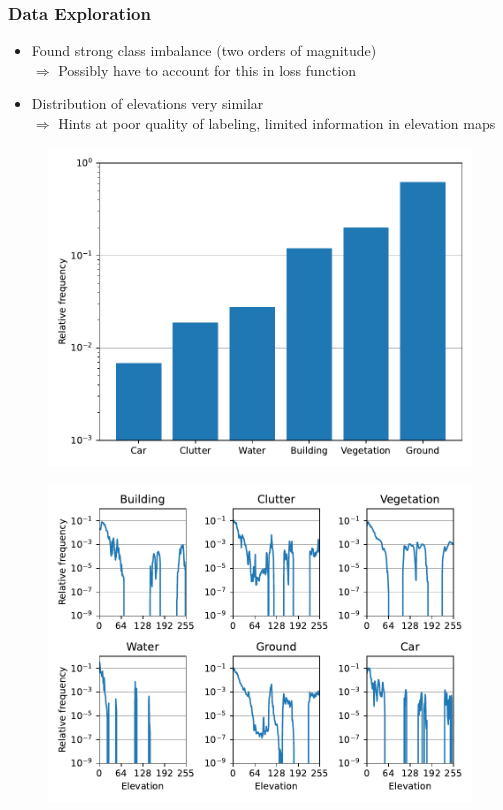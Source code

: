 \documentclass{beamer}
\begin{document}
\begin{frame}
\frametitle{Data Exploration}
\begin{itemize}
\item Found strong class imbalance (two orders of magnitude)\\
$\Rightarrow$ Possibly have to account for this in loss function
\item Distribution of elevations very similar\\
$\Rightarrow$ Hints at poor quality of labeling, limited information in elevation maps
\end{itemize}
\begin{minipage}{0.49\textwidth}
\begin{figure}
\includegraphics[width=\textwidth]{images/relative_frequency.pdf}
\end{figure}
\end{minipage}
\begin{minipage}{0.49\textwidth}
\begin{figure}
\includegraphics[width=\textwidth]{images/elevation_distribution.pdf}
\end{figure}
\end{minipage}

\end{frame}
\end{document}
